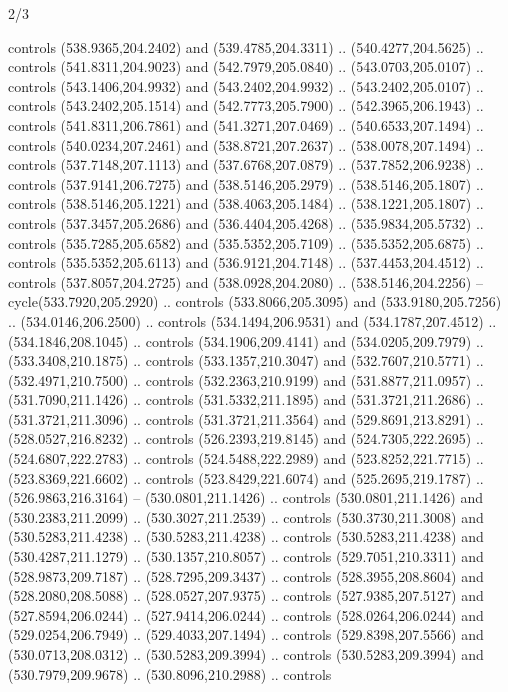 \begin{flagdescription}{2/3}
\begin{scope}[xshift=0.5\flaglength,yshift=0.5\flagwidth,scale=\flagwidth/495.65]
\begin{scope}[y=0.8pt, x=0.8pt, yscale=-1,shift={(-463.76,-309.78)}]
  controls (538.9365,204.2402) and (539.4785,204.3311) .. (540.4277,204.5625) ..
  controls (541.8311,204.9023) and (542.7979,205.0840) .. (543.0703,205.0107) ..
  controls (543.1406,204.9932) and (543.2402,204.9932) .. (543.2402,205.0107) ..
  controls (543.2402,205.1514) and (542.7773,205.7900) .. (542.3965,206.1943) ..
  controls (541.8311,206.7861) and (541.3271,207.0469) .. (540.6533,207.1494) ..
  controls (540.0234,207.2461) and (538.8721,207.2637) .. (538.0078,207.1494) ..
  controls (537.7148,207.1113) and (537.6768,207.0879) .. (537.7852,206.9238) ..
  controls (537.9141,206.7275) and (538.5146,205.2979) .. (538.5146,205.1807) ..
  controls (538.5146,205.1221) and (538.4063,205.1484) .. (538.1221,205.1807) ..
  controls (537.3457,205.2686) and (536.4404,205.4268) .. (535.9834,205.5732) ..
  controls (535.7285,205.6582) and (535.5352,205.7109) .. (535.5352,205.6875) ..
  controls (535.5352,205.6113) and (536.9121,204.7148) .. (537.4453,204.4512) ..
  controls (537.8057,204.2725) and (538.0928,204.2080) .. (538.5146,204.2256) --
  cycle(533.7920,205.2920) .. controls (533.8066,205.3095) and
  (533.9180,205.7256) .. (534.0146,206.2500) .. controls (534.1494,206.9531) and
  (534.1787,207.4512) .. (534.1846,208.1045) .. controls (534.1906,209.4141) and
  (534.0205,209.7979) .. (533.3408,210.1875) .. controls (533.1357,210.3047) and
  (532.7607,210.5771) .. (532.4971,210.7500) .. controls (532.2363,210.9199) and
  (531.8877,211.0957) .. (531.7090,211.1426) .. controls (531.5332,211.1895) and
  (531.3721,211.2686) .. (531.3721,211.3096) .. controls (531.3721,211.3564) and
  (529.8691,213.8291) .. (528.0527,216.8232) .. controls (526.2393,219.8145) and
  (524.7305,222.2695) .. (524.6807,222.2783) .. controls (524.5488,222.2989) and
  (523.8252,221.7715) .. (523.8369,221.6602) .. controls (523.8429,221.6074) and
  (525.2695,219.1787) .. (526.9863,216.3164) -- (530.0801,211.1426) .. controls
  (530.0801,211.1426) and (530.2383,211.2099) .. (530.3027,211.2539) .. controls
  (530.3730,211.3008) and (530.5283,211.4238) .. (530.5283,211.4238) .. controls
  (530.5283,211.4238) and (530.4287,211.1279) .. (530.1357,210.8057) .. controls
  (529.7051,210.3311) and (528.9873,209.7187) .. (528.7295,209.3437) .. controls
  (528.3955,208.8604) and (528.2080,208.5088) .. (528.0527,207.9375) .. controls
  (527.9385,207.5127) and (527.8594,206.0244) .. (527.9414,206.0244) .. controls
  (528.0264,206.0244) and (529.0254,206.7949) .. (529.4033,207.1494) .. controls
  (529.8398,207.5566) and (530.0713,208.0312) .. (530.5283,209.3994) .. controls
  (530.5283,209.3994) and (530.7979,209.9678) .. (530.8096,210.2988) .. controls

\end{scope}
\end{scope}
\end{flagdescription}
